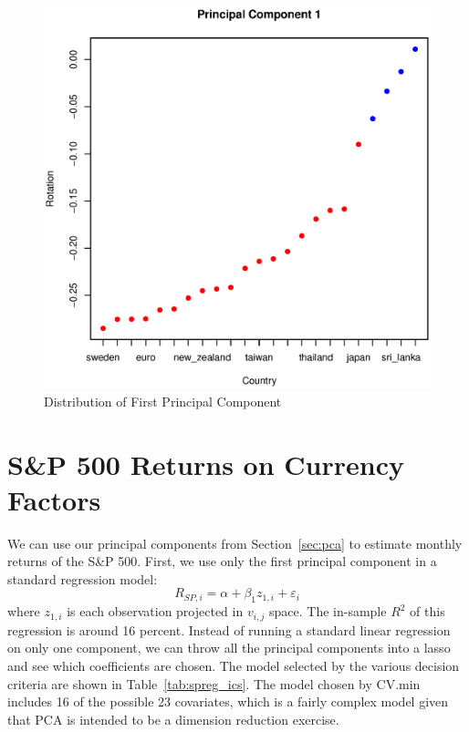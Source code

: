 \documentclass[11pt, fleqn]{article}
\begin{document}
\begin{figure}[!htb]
  \centering
  \includegraphics[scale=.5]{pc1_pegs.eps}
  \caption{Distribution of First Principal Component}
  \label{fig:pc1_pegs}
\end{figure} 

\section{S\&P 500 Returns on Currency Factors} \label{sec:sp500}

We can use our principal components from Section~\ref{sec:pca} to estimate monthly returns of the S\&P 500. First, we use only the first principal component in a standard regression model:
\begin{equation}
R_{SP,i} = \alpha + \beta_1 z_{1,i} + \varepsilon_{i}
\end{equation}
where $z_{1,i}$ is each observation projected in $v_{i,j}$ space. The in-sample $R^2$ of this regression is around 16 percent. Instead of running a standard linear regression on only one component, we can throw all the principal components into a lasso and see which coefficients are chosen. The model selected by the various decision criteria are shown in Table~\ref{tab:spreg_ics}. The model chosen by CV.min includes 16 of the possible 23 covariates, which is a fairly complex model given that PCA is intended to be a dimension reduction exercise. 
\end{document}
